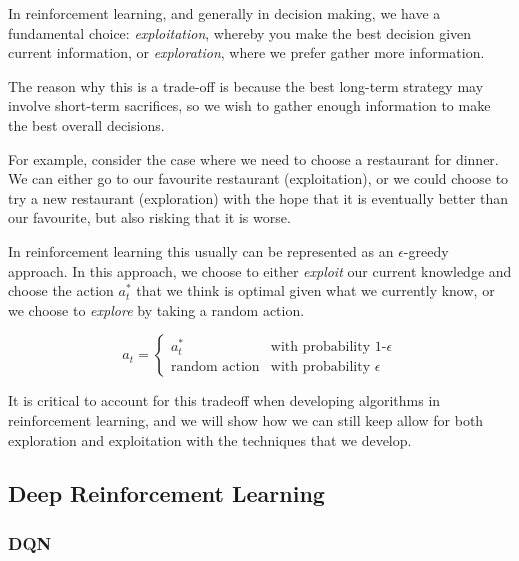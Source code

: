 In reinforcement learning, and generally in decision making, we have a fundamental choice: \textit{exploitation}, whereby you make the best decision given current information, or \textit{exploration}, where we prefer gather more information.

The reason why this is a trade-off is because the best long-term strategy may involve short-term sacrifices, so we wish to gather enough information to make the best overall decisions.

For example, consider the case where we need to choose a restaurant for dinner. We can either go to our favourite restaurant (exploitation), or we could choose to try a new restaurant (exploration) with the hope that it is eventually better than our favourite, but also risking that it is worse.

In reinforcement learning this usually can be represented as an $\epsilon$-greedy approach. In this approach, we choose to either \textit{exploit} our current knowledge and choose the action $a_t^*$ that we think is optimal given what we currently know, or we choose to \textit{explore} by taking a random action.

\[
a_t =
\left\{
	\begin{array}{ll}
		a_t^*   & \mbox{with probability 1-$\epsilon$}\\
		\text{random action} & \mbox{with probability $\epsilon$}
	\end{array}
\right.
\]

It is critical to account for this tradeoff when developing algorithms in reinforcement learning, and we will show how we can still keep allow for both exploration and exploitation with the techniques that we develop.

\subsection{Deep Reinforcement Learning}
\subsubsection{DQN}

